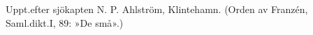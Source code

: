 Uppt.\@ efter sjökapten N. P. Ahlström, Klintehamn.
(Orden av Franzén, Saml.\@ dikt.\@ I, 89: »De små».)
